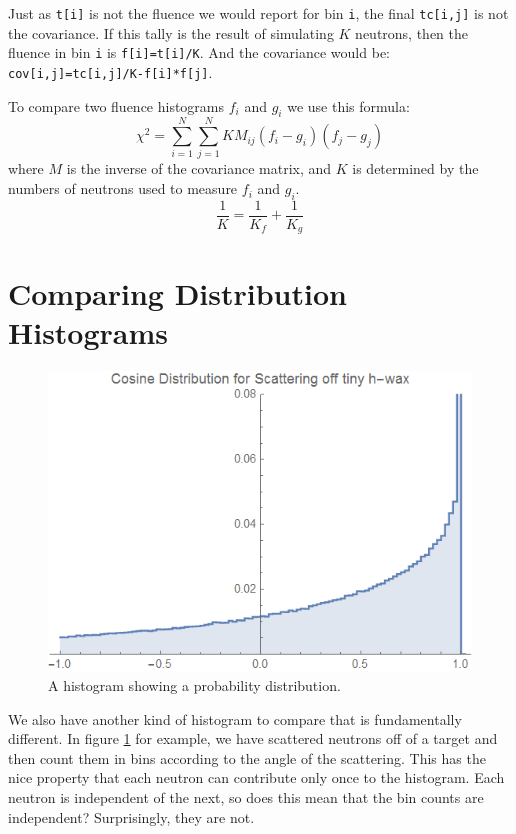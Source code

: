 \documentclass[letterpaper,12pt]{article}
\newcommand{\myMatrix}[1]{\bm{\mathit{#1}}}
\begin{document}
Just as \texttt{t[i]} is not the fluence we would report for bin \texttt{i}, the final \texttt{tc[i,j]} is not the covariance. If this tally is the result of simulating $K$ neutrons, then the fluence in bin \texttt{i} is \texttt{f[i]=t[i]/K}. And the covariance would be: \texttt{cov[i,j]=tc[i,j]/K-f[i]*f[j]}.

To compare two fluence histograms $f_i$ and $g_i$ we use this formula:
\begin{equation} \label{eq.chi.square.fluence}
	\chi^2=\sum_{i=1}^N \sum_{j=1}^N K\myMatrix{M}_{ij}(f_i - g_i)(f_j - g_j)
\end{equation}
where $\myMatrix{M}$ is the inverse of the covariance matrix, and $K$ is determined by the numbers of neutrons used to measure $f_i$ and $g_i$.
\begin{equation}
	\frac{1}{K}=\frac{1}{K_f}+\frac{1}{K_g}
\end{equation}


\section{Comparing Distribution Histograms}

\begin{figure}[ht] 
	\centering	\includegraphics[width=0.7\columnwidth]{CosineDistributionMCNP}
	\caption{
		\label{fig.cosine}
		A histogram showing a probability distribution.
	}
\end{figure}

We also have another kind of histogram to compare that is fundamentally different. In figure \ref{fig.cosine} for example, we have scattered neutrons off of a target and then count them in bins according to the angle of the scattering. This has the nice property that each neutron can contribute only once to the histogram. Each neutron is independent of the next, so does this mean that the bin counts are independent? Surprisingly, they are not.
\end{document}
